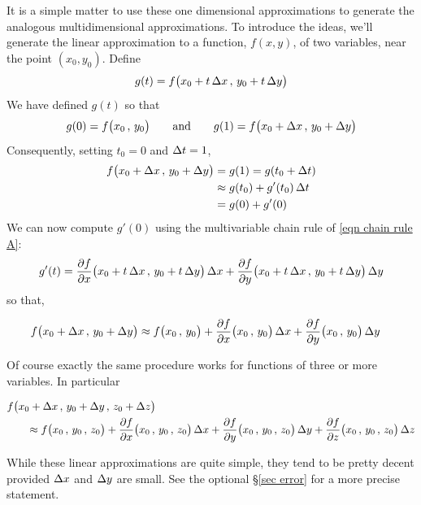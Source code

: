 It is a simple matter to use these one dimensional approximations 
to generate the analogous multidimensional approximations. To introduce 
the ideas, we'll generate the linear approximation to a function, 
$f(x,y)$, of two variables, near the point $(x_0,y_0)$. Define
\begin{equation*}
g(t) = f\big(x_0+t\,\Delta x\,,\,y_0+t\,\Delta y\big)
\end{equation*}
We have defined $g(t)$ so that
\begin{equation*}
g(0) = f\big(x_0\,,\,y_0\big)\qquad\text{and}\qquad
g(1) = f\big(x_0 + \Delta x\,,\,y_0+\Delta y\big)
\end{equation*}
Consequently, setting $t_0=0$ and $\Delta t=1$, 
\begin{align*}
f\big(x_0+\Delta x\,,\,y_0+\Delta y\big)
&=g(1) = g(t_0+\Delta t) \\
&\approx g(t_0) + g'(t_0)\,\Delta t \\
&= g(0) + g'(0)
\end{align*}
We can now compute $g'(0)$ using the multivariable chain rule of 
\eqref{eqn chain rule A}:
\begin{equation*}
g'(t) = \pdiff{f}{x}\big(x_0+t\,\De x\,,\,y_0+t\,\De y\big)\,\De x
       + \pdiff{f}{y}\big(x_0+t\,\De x\,,\,y_0+t\,\De y\big)\,\De y
\end{equation*}
so that, 
\begin{impeqn}\label{eqn lin approx 2d}
\begin{align*}
f\big(x_0+\De x\,,\,y_0+\De y\big)
&\approx f\big(x_0\,,\,y_0\big) 
       + \pdiff{f}{x}\big(x_0\,,\,y_0\big)\,\De x
       + \pdiff{f}{y}\big(x_0\,,\,y_0\big)\,\De y
\end{align*}
\end{impeqn}\noindent
Of course exactly the same procedure works for functions of three or 
more variables. In particular 
\begin{impeqn}\label{eqn lin approx 3d}
\begin{align*}
&f\big(x_0+\De x\,,\,y_0+\De y\,,\,z_0 + \De z\big) \\
&\hskip0.25in\approx f\big(x_0\,,\,y_0\,,\,z_0\big) 
       + \pdiff{f}{x}\big(x_0\,,\,y_0\,,\,z_0\big)\,\De x
       + \pdiff{f}{y}\big(x_0\,,\,y_0\,,\,z_0\big)\,\De y
       + \pdiff{f}{z}\big(x_0\,,\,y_0\,,\,z_0\big)\,\De z
\end{align*}
\end{impeqn}\noindent
While these linear approximations are quite simple, they tend to be 
pretty decent provided $\Delta x$ and $\Delta y$ are small. See the 
optional \S\ref{sec error} for a more precise statement.

